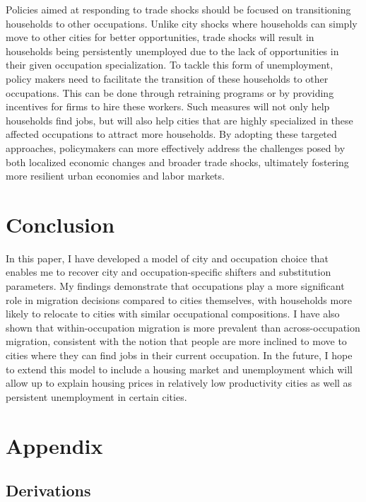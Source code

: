 \documentclass[10pt]{article}
\begin{document}
Policies aimed at responding to trade shocks should be focused on transitioning households to other occupations. Unlike city shocks where households can simply move to other cities for better opportunities, trade shocks will result in households being persistently unemployed due to the lack of opportunities in their given occupation specialization. To tackle this form of unemployment, policy makers need to facilitate the transition of these households to other occupations. This can be done through retraining programs or by providing incentives for firms to hire these workers. Such measures will not only help households find jobs, but will also help cities that are highly specialized in these affected occupations to attract more households. By adopting these targeted approaches, policymakers can more effectively address the challenges posed by both localized economic changes and broader trade shocks, ultimately fostering more resilient urban economies and labor markets.

\section{Conclusion}

In this paper, I have developed a model of city and occupation choice that enables me to recover city and occupation-specific shifters and substitution parameters. My findings demonstrate that occupations play a more significant role in migration decisions compared to cities themselves, with households more likely to relocate to cities with similar occupational compositions. I have also shown that within-occupation migration is more prevalent than across-occupation migration, consistent with the notion that people are more inclined to move to cities where they can find jobs in their current occupation. In the future, I hope to extend this model to include a housing market and unemployment which will allow up to explain housing prices in relatively low productivity cities as well as persistent unemployment in certain cities.

\newpage


\newpage

\section{Appendix}

\subsection{Derivations}
\end{document}
